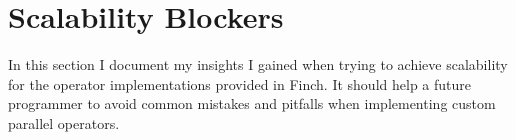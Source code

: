 \section{Scalability Blockers}

In this section I document my insights I gained when trying to achieve scalability for the operator implementations provided in Finch.
It should help a future programmer to avoid common mistakes and pitfalls when implementing custom parallel operators.

